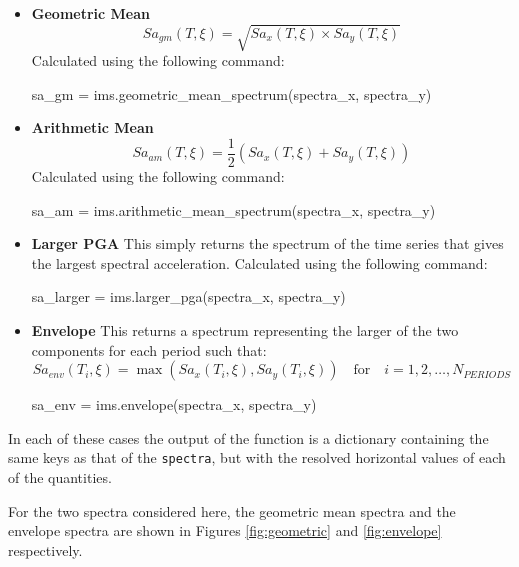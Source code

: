 \begin{itemize}
\item \textbf{Geometric Mean}
    \begin{equation}
    Sa_{gm} \left( {T, \xi} \right) = \sqrt{Sa_x \left( {T, \xi} \right) \times Sa_y \left( {T, \xi} \right)}
    \end{equation}
    Calculated using the following command:
    \begin{python}
sa_gm = ims.geometric_mean_spectrum(spectra_x, spectra_y)
    \end{python}
    
\item \textbf{Arithmetic Mean}
    \begin{equation}
    Sa_{am} \left( {T, \xi} \right) = \frac{1}{2} \left( {Sa_x \left( {T, \xi} \right) + Sa_y \left( {T, \xi} \right)} \right)
    \end{equation}  
        Calculated using the following command:
    \begin{python}
sa_am = ims.arithmetic_mean_spectrum(spectra_x, spectra_y)
    \end{python}  

\item \textbf{Larger PGA}
    This simply returns the spectrum of the time series that gives the largest spectral acceleration. Calculated using the following command:
    \begin{python}
sa_larger = ims.larger_pga(spectra_x, spectra_y)
    \end{python}   

\item \textbf{Envelope}
    This returns a spectrum representing the larger of the two components for each period such that:
    \begin{equation}
    Sa_{env} \left( {T_i, \xi} \right) = \max\left( {Sa_x \left( {T_i, \xi} \right), Sa_y \left( {T_i, \xi} \right)} \right) \quad \text{for} \quad i = 1, 2, \ldots, N_{PERIODS}  
    \end{equation}
    \begin{python}
sa_env = ims.envelope(spectra_x, spectra_y)
    \end{python}  
\end{itemize}

In each of these cases the output of the function is a dictionary containing the same keys as that of the \verb=spectra=, but with the resolved horizontal values of each of the quantities. 

For the two spectra considered here, the geometric mean spectra and the envelope spectra are shown in Figures \ref{fig:geometric} and \ref{fig:envelope} respectively. 

